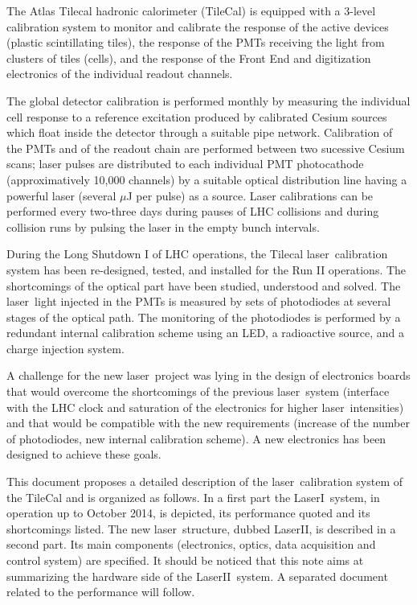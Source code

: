 \documentclass[UKenglish,texlive=2013]{\ATLASLATEXPATH atlasdoc}
\newcommand{\laser}{laser}
\newcommand{\lasi}{LaserI}
\newcommand{\lasii}{LaserII}
\begin{document}
The Atlas Tilecal hadronic calorimeter (TileCal) \cite{ref:tilecal} is equipped with a 3-level calibration system to monitor and  calibrate the response of the active devices (plastic scintillating tiles), the response of the PMTs receiving the light from clusters of tiles (cells), and the response of the Front End and digitization electronics of the individual readout channels. \par
The global detector calibration is performed monthly by measuring the individual cell response to a reference excitation produced by calibrated Cesium sources \cite{ref:cesiumscan} which float inside the detector through a suitable pipe network.
Calibration of the PMTs and of the readout chain are performed between two sucessive Cesium scans; laser pulses are distributed to each individual PMT photocathode (approximatively 10,000 channels) by a suitable optical distribution line having a powerful laser (several $\mu$J per pulse) as a source. Laser calibrations can be performed every two-three days during pauses of LHC collisions and during collision runs by pulsing the laser in the empty bunch intervals.  \par
During the Long Shutdown I of LHC operations, the Tilecal \laser~calibration system has been re-designed, tested, and installed for the Run II operations. The shortcomings of the optical part have been studied, understood and solved. The \laser~light injected in the PMTs is measured by sets of photodiodes at several stages of the optical path. The monitoring of the photodiodes is performed by a redundant internal calibration scheme using an LED, a radioactive source, and a charge injection system. \par
A challenge for the new \laser~project was lying in the design of electronics boards that would overcome the shortcomings of the previous \laser~system (interface with the LHC clock and saturation of the electronics for higher \laser~intensities) and that would be compatible with the new requirements (increase of the number of photodiodes, new internal calibration scheme). A new electronics has been designed to achieve these goals.\par
This document proposes a detailed description of the \laser~calibration system of the TileCal and is organized as follows. In a first part the \lasi~system, in operation up to October 2014, is depicted, its performance quoted and its shortcomings listed. The new \laser~structure, dubbed \lasii, is described in a second part. Its main components (electronics, optics, data acquisition and control system) are specified. It should be noticed that this note aims at summarizing the hardware side of the \lasii~system. A separated document related to the performance will follow. 
\end{document}
